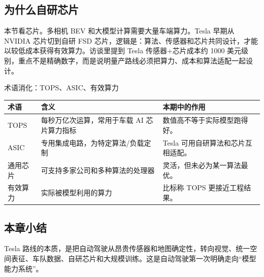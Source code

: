 \subsection{为什么自研芯片}

本节看芯片。多相机 BEV 和大模型计算需要大量车端算力。Tesla 早期从 NVIDIA 芯片切到自研 FSD 芯片，逻辑是：算法、传感器和芯片共同设计，才能以较低成本获得有效算力。访谈里提到 Tesla 传感器+芯片成本约 1000 美元级别，重点不是精确数字，而是说明量产路线必须把算力、成本和算法适配一起设计。

\begin{knowledgebox}{术语消化：TOPS、ASIC、有效算力}
\noindent\begin{tabularx}{\textwidth}{p{}p{}X}
\toprule
术语 & 含义 & 本期中的作用 \\
\midrule
TOPS & 每秒万亿次运算，常用于车载 AI 芯片算力指标 & 数值高不等于实际模型跑得好。 \\
ASIC & 专用集成电路，为特定算法/负载定制 & Tesla 可用自研算法和芯片互相适配。 \\
通用芯片 & 可支持多家公司和多种算法的处理器 & 灵活，但未必为某一算法最优。 \\
有效算力 & 实际被模型利用的算力 & 比标称 TOPS 更接近工程结果。 \\
\bottomrule
\end{tabularx}
\end{knowledgebox}

\subsection{本章小结}

Tesla 路线的本质，是把自动驾驶从昂贵传感器和地图确定性，转向视觉、统一空间表征、车队数据、自研芯片和大规模训练。这是自动驾驶第一次明确走向“模型能力系统”。

